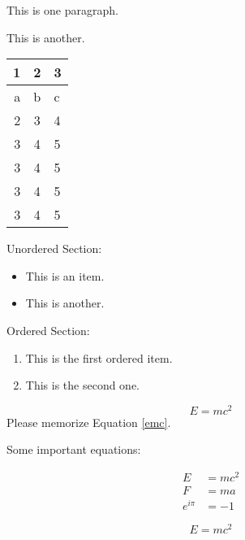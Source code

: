 \documentclass{article}
\begin{document}
This is one paragraph.

This is another. \\


\begin{tabular}{r | cl}
1 & 2 & 3\\
\hline
a & b & c\\
2 & 3 & 4\\
3 & 4 & 5\\
3 & 4 & 5\\
3 & 4 & 5\\
3 & 4 & 5\\
\end{tabular}

Unordered Section:
\begin{itemize}
\item This is an item. \\
\item This is another. \\
\end{itemize}

Ordered Section:
\begin{enumerate}
\item This is the first ordered item. \\
\item This is the second one. \\
\end{enumerate}

\begin{equation}
\label{emc}
E = mc^2
\end{equation}
Please memorize Equation \ref{emc}.

Some important equations:

\begin{align}
\label{einstein}
E & = mc^2 \\
\label{newton}
F & = ma \\
\label{euler}
e^{i \pi} & = -1
\end{align}

$$E = mc^2$$
\end{document}
